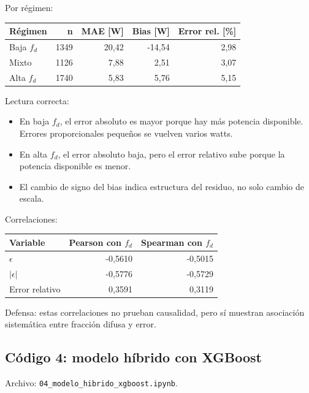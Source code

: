 \documentclass[11pt, letterpaper]{article}
\newcommand{\fd}{f_d}
\begin{document}
Por r\'egimen:

\begin{center}
\begin{tabular}{lrrrr}
\toprule
\textbf{R\'egimen} & \textbf{n} & \textbf{MAE [W]} & \textbf{Bias [W]} & \textbf{Error rel. [\%]} \\
\midrule
Baja \(\fd\) & 1349 & 20,42 & -14,54 & 2,98 \\
Mixto & 1126 & 7,88 & 2,51 & 3,07 \\
Alta \(\fd\) & 1740 & 5,83 & 5,76 & 5,15 \\
\bottomrule
\end{tabular}
\end{center}

Lectura correcta:

\begin{itemize}
    \item En baja \(\fd\), el error absoluto es mayor porque hay m\'as potencia disponible. Errores proporcionales peque\~nos se vuelven varios watts.
    \item En alta \(\fd\), el error absoluto baja, pero el error relativo sube porque la potencia disponible es menor.
    \item El cambio de signo del bias indica estructura del residuo, no solo cambio de escala.
\end{itemize}

Correlaciones:

\begin{center}
\begin{tabular}{lrr}
\toprule
\textbf{Variable} & \textbf{Pearson con \(\fd\)} & \textbf{Spearman con \(\fd\)} \\
\midrule
\(\epsilon\) & -0,5610 & -0,5015 \\
\(|\epsilon|\) & -0,5776 & -0,5729 \\
Error relativo & 0,3591 & 0,3119 \\
\bottomrule
\end{tabular}
\end{center}

Defensa: estas correlaciones no prueban causalidad, pero s\'i muestran asociaci\'on sistem\'atica entre fracci\'on difusa y error.

\subsection{C\'odigo 4: modelo h\'ibrido con XGBoost}

Archivo: \texttt{04\_modelo\_hibrido\_xgboost.ipynb}.
\end{document}
